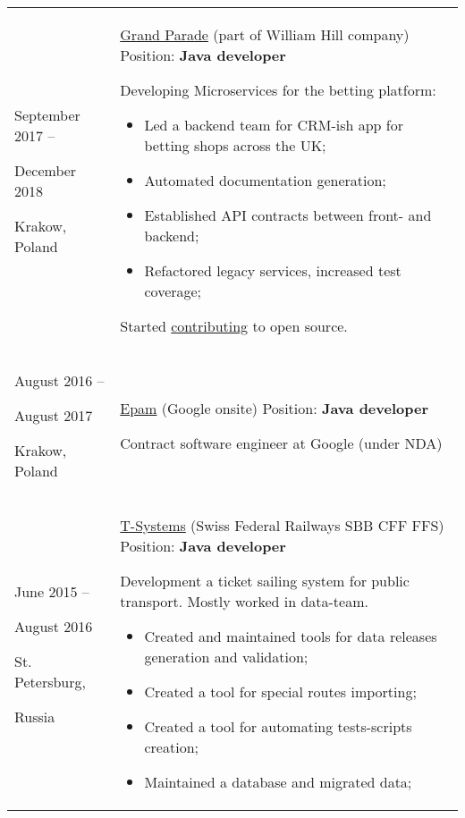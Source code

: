 \documentclass{article}
\begin{document}
\begin{longtable}{p{0.00in}p{0.00in}p{0.0in}p{0.00in}p{0.00in}}
\multicolumn{2}{p{\dimexpr1.00in+2\tabcolsep\relax}}{September 2017 -- \par December 2018 \par Krakow, Poland} &
\multicolumn{3}{p{\dimexpr5.85in+4\tabcolsep\relax}}{\href{https://grandparade.co.uk/}{Grand Parade} (part of William Hill company)
Position: \textbf{Java developer} \par
Developing Microservices for the betting platform:
\begin{itemize}
    \item Led a backend team for CRM-ish app for betting shops across the UK;
    \item Automated documentation generation;
    \item Established API contracts between front- and backend;
    \item Refactored legacy services, increased test coverage;
\end{itemize}
    Started \href{https://github.com/apache/ignite/commits?author=dehasi}{contributing} to open source.
\par} \\

\multicolumn{2}{p{\dimexpr1.00in+2\tabcolsep\relax}}{August 2016 -- \par August 2017 \par Krakow, Poland} &
\multicolumn{3}{p{\dimexpr5.85in+4\tabcolsep\relax}}{\href{https://www.epam.com/}{Epam} (Google onsite)
Position: \textbf{Java developer} \par \par
Contract software engineer at Google (under NDA)
\par}\\

\multicolumn{2}{p{\dimexpr1.00in+2\tabcolsep\relax}}{June 2015 -- \par August 2016 \par St. Petersburg, \par Russia} &
\multicolumn{3}{p{\dimexpr5.85in+4\tabcolsep\relax}}{\href{https://www.t-systems.com/ru/en}{T-Systems} (Swiss Federal Railways SBB CFF FFS)
Position: \textbf{Java developer} \par
Development a ticket sailing system for public transport. Mostly worked in data-team.
\begin{itemize}
    \item Created and maintained tools for data releases generation and validation;
    \item Created a tool for special routes importing;
    \item Created a tool for automating tests-scripts creation;
    \item Maintained a database and migrated data;
\end{itemize}
\par} \\


\end{longtable}
\end{document}
